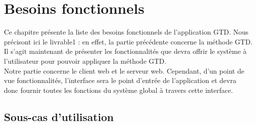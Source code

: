 \chapter{Besoins fonctionnels}

Ce chapitre présente la liste des besoins fonctionnels de l'application GTD. Nous précisont ici le livrable1 : en effet, la partie précédente concerne la méthode GTD. Il s'agit maintenant de présenter les fonctionnalités que devra offrir le système à l'utilisateur pour pouvoir appliquer la méthode GTD.\\

Notre partie concerne le client web et le serveur web. Cependant, d'un point de vue fonctionnalités, l'interface sera le point d'entrée de l'application et devra donc fournir toutes les fonctions du système global à travers cette interface.\\

\section{Sous-cas d'utilisation}

